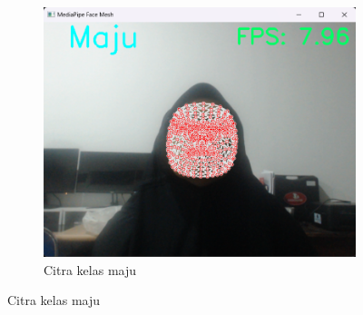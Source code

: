 \begin{figure}[H]
  \begin{subfigure}{0.3\textwidth}
      \centering
      \includegraphics[width=\linewidth]{gambar/46 maju.png}
      \caption{Citra kelas maju}
      \label{fig:image3}
  \end{subfigure}
  

\end{figure}
